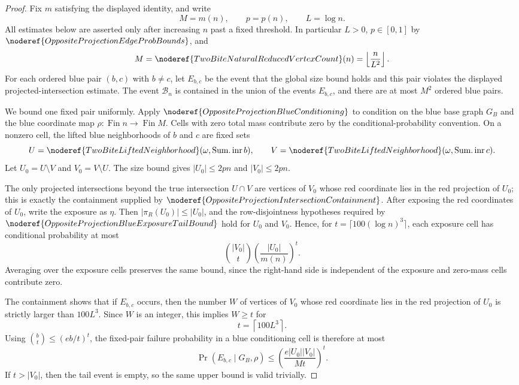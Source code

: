 \begin{proof}
Fix \(m\) satisfying the displayed identity, and write
\[
  M=m(n),\qquad p=p(n),\qquad L=\log n .
\]
All estimates below are asserted only after increasing \(n\) past a fixed
threshold.  In particular \(L>0\), \(p\in[0,1]\) by
\(\noderef{OppositeProjectionEdgeProbBounds}\), and
\[
M=\noderef{TwoBiteNaturalReducedVertexCount}(n)
  =\left\lfloor\frac{n}{L^2}\right\rfloor .
\]
For each ordered blue pair \((b,c)\) with \(b\ne c\), let \(E_{b,c}\) be the
event that the global size bound holds and this pair violates the displayed
projected-intersection estimate.  The event \(\mathcal B_n\) is contained in
the union of the events \(E_{b,c}\), and there are at most \(M^2\) ordered
blue pairs.

We bound one fixed pair uniformly.  Apply
\(\noderef{OppositeProjectionBlueConditioning}\) to condition on the blue
base graph \(G_B\) and the blue coordinate map \(\rho:\operatorname{Fin} n
\to \operatorname{Fin} M\).  Cells with zero total mass contribute zero by
the conditional-probability convention.  On a nonzero cell, the lifted blue
neighborhoods of \(b\) and \(c\) are fixed sets
\[
  U=\noderef{TwoBiteLiftedNeighborhood}(\omega,\operatorname{Sum.inr} b),
  \qquad
  V=\noderef{TwoBiteLiftedNeighborhood}(\omega,\operatorname{Sum.inr} c).
\]
Let \(U_0=U\setminus V\) and \(V_0=V\setminus U\).  The size bound gives
\(|U_0|\le 2pn\) and \(|V_0|\le 2pn\).

The only projected intersections beyond the true intersection \(U\cap V\)
are vertices of \(V_0\) whose red coordinate lies in the red projection of
\(U_0\); this is exactly the containment supplied by
\(\noderef{OppositeProjectionIntersectionContainment}\).  After exposing the
red coordinates of \(U_0\), write the exposure as \(\eta\).  Then
\(|\pi_R(U_0)|\le |U_0|\), and the row-disjointness hypotheses required by
\(\noderef{OppositeProjectionBlueExposureTailBound}\) hold for \(U_0\) and
\(V_0\).  Hence, for \(t=\lceil100(\log n)^3\rceil\), each exposure cell has
conditional probability at most
\[
  \binom{|V_0|}{t}\left(\frac{|U_0|}{m(n)}\right)^t.
\]
Averaging over the exposure cells preserves the same bound, since the
right-hand side is independent of the exposure and zero-mass cells contribute
zero.

The containment shows that if \(E_{b,c}\) occurs, then the number \(W\) of
vertices of \(V_0\) whose red coordinate lies in the red projection of
\(U_0\) is strictly larger than \(100L^3\).  Since \(W\) is an integer, this
implies \(W\ge t\) for
\[
  t=\left\lceil100L^3\right\rceil .
\]
Using \(\binom bt\le (eb/t)^t\), the fixed-pair failure probability in a
blue conditioning cell is therefore at most
\[
  \Pr(E_{b,c}\mid G_B,\rho)
    \le \left(\frac{e|U_0||V_0|}{Mt}\right)^t .
\]
If \(t>|V_0|\), then the tail event is empty, so the same upper bound is
valid trivially.


\end{proof}
